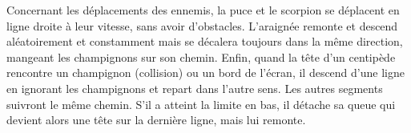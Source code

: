Concernant les déplacements des ennemis, la puce et le scorpion se déplacent en ligne droite à leur vitesse, sans avoir d'obstacles. L'araignée remonte et descend aléatoirement et constamment mais se décalera toujours dans la même direction, mangeant les champignons sur son chemin. Enfin, quand la tête d'un centipède rencontre un champignon (collision) ou un bord de l'écran, il descend d'une ligne en ignorant les champignons et repart dans l'autre sens. Les autres segments suivront le même chemin. S'il a atteint la limite en bas, il détache sa queue qui devient alors une tête sur la dernière ligne, mais lui remonte.

